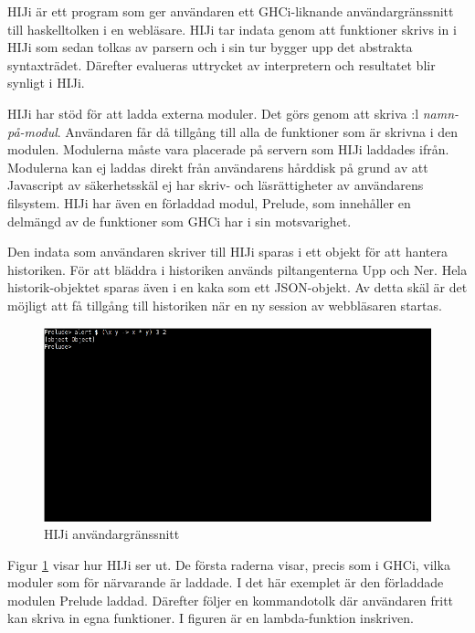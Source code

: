 HIJi är ett program som ger användaren ett GHCi-liknande användargränssnitt till haskelltolken i en webläsare. 
HIJi tar indata genom att funktioner skrivs in i HIJi som sedan tolkas av parsern och i sin tur bygger upp det abstrakta syntaxträdet. Därefter evalueras uttrycket av interpretern och resultatet blir synligt i HIJi.

HIJi har stöd för att ladda externa moduler. Det görs genom att skriva :l \emph{namn-på-modul}. Användaren får då tillgång till alla de funktioner som är skrivna i den modulen. Modulerna måste vara placerade på servern som HIJi laddades ifrån. Modulerna kan ej laddas direkt från användarens hårddisk på grund av att Javascript av säkerhetsskäl ej har skriv- och läsrättigheter av användarens filsystem. HIJi har även en förladdad modul, Prelude, som innehåller en delmängd av de funktioner som GHCi har i sin motsvarighet. 

Den indata som användaren skriver till HIJi sparas i ett objekt för att hantera historiken. För att bläddra i historiken används piltangenterna Upp och Ner. Hela historik-objektet sparas även i en kaka som ett JSON-objekt. Av detta skäl är det möjligt att få tillgång till historiken när en ny session av webbläsaren startas.

\begin{figure}[H]
    \begin{center}
        \includegraphics[width=1\textwidth]{hiji_screen3.png}
        \caption{HIJi användargränssnitt}
        \label{fig:hiji} %
    \end{center}
\end{figure}

Figur \ref{fig:hiji} visar hur HIJi ser ut. De första raderna visar, precis som i GHCi, vilka moduler som för närvarande är laddade. I det här exemplet är den förladdade modulen Prelude laddad. Därefter följer en kommandotolk där användaren fritt kan skriva in egna funktioner. I figuren är en lambda-funktion inskriven.

